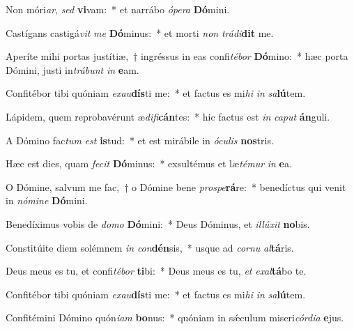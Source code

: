 \item Non móri\textit{ar}, \textit{sed} \textbf{vi}vam:~* et narrábo \textit{ó}\textit{pe}\textit{ra} \textbf{Dó}mini.
\item Castígans castigá\textit{vit} \textit{me} \textbf{Dó}minus:~* et morti \textit{non} \textit{trá}\textit{di}\textbf{dit} me.
\item Aperíte mihi portas justítiæ,~† ingréssus in eas confi\textit{té}\textit{bor} \textbf{Dó}mino:~* hæc porta Dómini, justi in\textit{trá}\textit{bunt} \textit{in} \textbf{e}am.
\item Confitébor tibi quóniam \textit{ex}\textit{au}\textbf{dís}ti me:~* et factus es mi\textit{hi} \textit{in} \textit{sa}\textbf{lú}tem.
\item Lápidem, quem reprobavérunt æ\textit{di}\textit{fi}\textbf{cán}tes:~* hic factus est \textit{in} \textit{ca}\textit{put} \textbf{án}guli.
\item A Dómino fac\textit{tum} \textit{est} \textbf{is}tud:~* et est mirábile in \textit{ó}\textit{cu}\textit{lis} \textbf{nos}tris.
\item Hæc est dies, quam \textit{fe}\textit{cit} \textbf{Dó}minus:~* exsultémus et læ\textit{té}\textit{mur} \textit{in} \textbf{e}a.
\item O Dómine, salvum me fac,~† o Dómine bene \textit{pro}\textit{spe}\textbf{rá}re:~* benedíctus qui venit in \textit{nó}\textit{mi}\textit{ne} \textbf{Dó}mini.
\item Benedíximus vobis de \textit{do}\textit{mo} \textbf{Dó}mini:~* Deus Dóminus, et \textit{il}\textit{lú}\textit{xit} \textbf{no}bis.
\item Constitúite diem solémnem \textit{in} \textit{con}\textbf{dén}sis,~* usque ad \textit{cor}\textit{nu} \textit{al}\textbf{tá}ris.
\item Deus meus es tu, et confi\textit{té}\textit{bor} \textbf{ti}bi:~* Deus meus es tu, \textit{et} \textit{ex}\textit{al}\textbf{tá}bo te.
\item Confitébor tibi quóniam \textit{ex}\textit{au}\textbf{dís}ti me:~* et factus es mi\textit{hi} \textit{in} \textit{sa}\textbf{lú}tem.
\item Confitémini Dómino quón\textit{i}\textit{am} \textbf{bo}nus:~* quóniam in sǽculum miseri\textit{cór}\textit{di}\textit{a} \textbf{e}jus.
